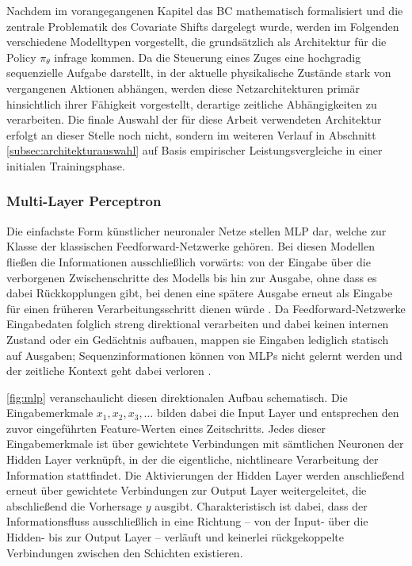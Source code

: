 Nachdem im vorangegangenen Kapitel das \gls{BC} mathematisch formalisiert und die zentrale Problematik des Covariate Shifts dargelegt wurde, werden im Folgenden verschiedene Modelltypen vorgestellt, die grundsätzlich als Architektur für die Policy $\pi_\theta$ infrage kommen. 
Da die Steuerung eines Zuges eine hochgradig sequenzielle Aufgabe darstellt, in der aktuelle physikalische Zustände stark von vergangenen Aktionen abhängen, werden diese Netzarchitekturen primär hinsichtlich ihrer Fähigkeit vorgestellt, derartige zeitliche Abhängigkeiten zu verarbeiten. 
Die finale Auswahl der für diese Arbeit verwendeten Architektur erfolgt an dieser Stelle noch nicht, sondern im weiteren Verlauf in Abschnitt \ref{subsec:architekturauswahl} auf Basis empirischer Leistungsvergleiche in einer initialen Trainingsphase.

\subsubsection{Multi-Layer Perceptron}
\label{subsec:mlp}

Die einfachste Form künstlicher neuronaler Netze stellen \gls{MLP} dar, welche zur Klasse der klassischen Feedforward-Netzwerke gehören. 
Bei diesen Modellen fließen die Informationen ausschließlich vorwärts: von der Eingabe über die verborgenen Zwischenschritte des Modells bis hin zur Ausgabe, ohne dass es dabei Rückkopplungen gibt, bei denen eine spätere Ausgabe erneut als Eingabe für einen früheren Verarbeitungsschritt dienen würde \cite[vgl.~S.~168]{chap2_Goo16}. 
Da Feedforward-Netzwerke Eingabedaten folglich streng direktional verarbeiten und dabei keinen internen Zustand oder ein Gedächtnis aufbauen, mappen sie Eingaben lediglich statisch auf Ausgaben; Sequenzinformationen können von \glspl{MLP} nicht gelernt werden und der zeitliche Kontext geht dabei verloren \cite[vgl.~S.~3]{chap2_Ife23}.

\autoref{fig:mlp} veranschaulicht diesen direktionalen Aufbau schematisch. 
Die Eingabemerkmale $x_1, x_2, x_3, \dots$ bilden dabei die Input Layer und entsprechen den zuvor eingeführten Feature-Werten eines Zeitschritts. 
Jedes dieser Eingabemerkmale ist über gewichtete Verbindungen mit sämtlichen Neuronen der Hidden Layer verknüpft, in der die eigentliche, nichtlineare Verarbeitung der Information stattfindet. 
Die Aktivierungen der Hidden Layer werden anschließend erneut über gewichtete Verbindungen zur Output Layer weitergeleitet, die abschließend die Vorhersage $y$ ausgibt. 
Charakteristisch ist dabei, dass der Informationsfluss ausschließlich in eine Richtung -- von der Input- über die Hidden- bis zur Output Layer -- verläuft und keinerlei rückgekoppelte Verbindungen zwischen den Schichten existieren.

